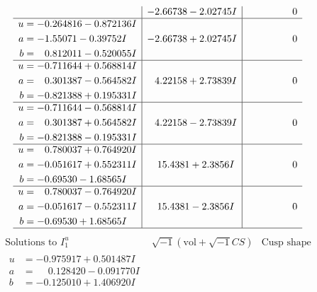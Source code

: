 \documentclass[1p]{elsarticle_modified}
\theoremstyle{definition}
\newcommand{\I}{\sqrt{-1}}
\begin{document}
$$\begin{array}{c|c|c}
 & -2.66738 - 2.02745 I & \phantom{-0.000000 } 0 \\ \hline\begin{aligned}
u &= -0.264816 - 0.872136 I \\
a &= -1.55071 - 0.39752 I \\
b &= \phantom{-}0.812011 - 0.520055 I\end{aligned}
 & -2.66738 + 2.02745 I & \phantom{-0.000000 } 0 \\ \hline\begin{aligned}
u &= -0.711644 + 0.568814 I \\
a &= \phantom{-}0.301387 - 0.564582 I \\
b &= -0.821388 + 0.195331 I\end{aligned}
 & \phantom{-}4.22158 + 2.73839 I & \phantom{-0.000000 } 0 \\ \hline\begin{aligned}
u &= -0.711644 - 0.568814 I \\
a &= \phantom{-}0.301387 + 0.564582 I \\
b &= -0.821388 - 0.195331 I\end{aligned}
 & \phantom{-}4.22158 - 2.73839 I & \phantom{-0.000000 } 0 \\ \hline\begin{aligned}
u &= \phantom{-}0.780037 + 0.764920 I \\
a &= -0.051617 + 0.552311 I \\
b &= -0.69530 - 1.68565 I\end{aligned}
 & \phantom{-}15.4381 + 2.3856 I & \phantom{-0.000000 } 0 \\ \hline\begin{aligned}
u &= \phantom{-}0.780037 - 0.764920 I \\
a &= -0.051617 - 0.552311 I \\
b &= -0.69530 + 1.68565 I\end{aligned}
 & \phantom{-}15.4381 - 2.3856 I & \phantom{-0.000000 } 0\\
 \hline 
 \end{array}$$\newpage$$\begin{array}{c|c|c}  
\text{Solutions to }I^u_{1}& \I (\text{vol} + \sqrt{-1}CS) & \text{Cusp shape}\\
 \hline 
\begin{aligned}
u &= -0.975917 + 0.501487 I \\
a &= \phantom{-}0.128420 - 0.091770 I \\
b &= -0.125010 + 1.406920 I\end{aligned}

\end{array}$$
\end{document}
